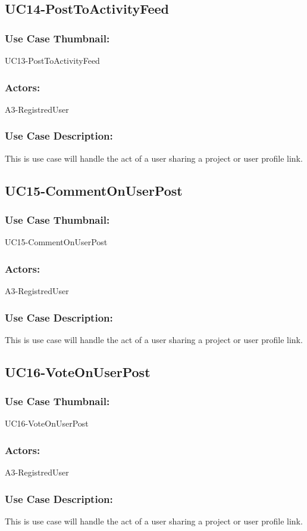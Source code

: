 \documentclass[11pt, openany]{report}
\begin{document}
\subsection{UC14-PostToActivityFeed}
\label{sUC14}
\subsubsection*{Use Case Thumbnail:}
UC13-PostToActivityFeed
\subsubsection*{Actors:}
A3-RegistredUser
\subsubsection*{Use Case Description:}
This is use case will handle the act of a user sharing a project or user profile link.


\subsection{UC15-CommentOnUserPost}
\label{sUC15}
\subsubsection*{Use Case Thumbnail:}
UC15-CommentOnUserPost
\subsubsection*{Actors:}
A3-RegistredUser
\subsubsection*{Use Case Description:}
This is use case will handle the act of a user sharing a project or user profile link.


\subsection{UC16-VoteOnUserPost}
\label{sUC16}
\subsubsection*{Use Case Thumbnail:}
UC16-VoteOnUserPost
\subsubsection*{Actors:}
A3-RegistredUser
\subsubsection*{Use Case Description:}
This is use case will handle the act of a user sharing a project or user profile link.
\end{document}
